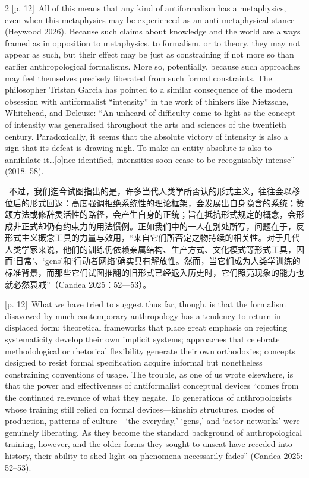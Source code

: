 \documentclass[10pt,a4paper]{article}
\begin{document}
\begin{paracol}{2}
\switchcolumn
{\scriptsize\color{gray} [p. 12]}\ All of this means that any kind of antiformalism has a metaphysics, even when this metaphysics may be experienced as an anti-metaphysical stance (Heywood 2026). Because such claims about knowledge and the world are always framed as in opposition to metaphysics, to formalism, or to theory, they may not appear as such, but their effect may be just as constraining if not more so than earlier anthropological formalisms. More so, potentially, because such approaches may feel themselves precisely liberated from such formal constraints. The philosopher Tristan Garcia has pointed to a similar consequence of the modern obsession with antiformalist “intensity” in the work of thinkers like Nietzsche, Whitehead, and Deleuze: “An unheard of difficulty came to light as the concept of intensity was generalised throughout the arts and sciences of the twentieth century. Paradoxically, it seems that the absolute victory of intensity is also a sign that its defeat is drawing nigh. To make an entity absolute is also to annihilate it…[o]nce identified, intensities soon cease to be recognisably intense” (2018: 58).\par
\switchcolumn*
{\scriptsize\color{gray} [p. 12]}\ 不过，我们迄今试图指出的是，许多当代人类学所否认的形式主义，往往会以移位后的形式回返：高度强调拒绝系统性的理论框架，会发展出自身隐含的系统；赞颂方法或修辞灵活性的路径，会产生自身的正统；旨在抵抗形式规定的概念，会形成非正式却仍有约束力的用法惯例。正如我们中的一人在别处所写，问题在于，反形式主义概念工具的力量与效用，“来自它们所否定之物持续的相关性。对于几代人类学家来说，他们的训练仍依赖亲属结构、生产方式、文化模式等形式工具，因而‘日常’、‘gens’和‘行动者网络’确实具有解放性。然而，当它们成为人类学训练的标准背景，而那些它们试图推翻的旧形式已经退入历史时，它们照亮现象的能力也就必然衰减”（Candea 2025：52—53）。\par
\switchcolumn
{\scriptsize\color{gray} [p. 12]}\ What we have tried to suggest thus far, though, is that the formalism disavowed by much contemporary anthropology has a tendency to return in displaced form: theoretical frameworks that place great emphasis on rejecting systematicity develop their own implicit systems; approaches that celebrate methodological or rhetorical flexibility generate their own orthodoxies; concepts designed to resist formal specification acquire informal but nonetheless constraining conventions of usage. The trouble, as one of us wrote elsewhere, is that the power and effectiveness of antiformalist conceptual devices “comes from the continued relevance of what they negate. To generations of anthropologists whose training still relied on formal devices—kinship structures, modes of production, patterns of culture—‘the everyday,’ ‘gens,’ and ‘actor-networks’ were genuinely liberating. As they become the standard background of anthropological training, however, and the older forms they sought to unseat have receded into history, their ability to shed light on phenomena necessarily fades” (Candea 2025: 52–53).\par
\switchcolumn*
\end{paracol}
\end{document}
